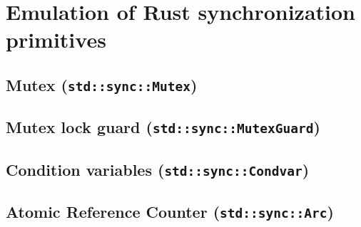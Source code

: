 \section{Emulation of Rust synchronization primitives}
\label{sec:sync-primitives}

\subsection{Mutex (\texttt{std::sync::Mutex})}

\subsection{Mutex lock guard (\texttt{std::sync::MutexGuard})}

\subsection{Condition variables (\texttt{std::sync::Condvar})}

\subsection{Atomic Reference Counter (\texttt{std::sync::Arc})}